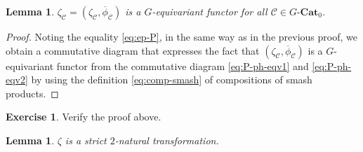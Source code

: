 \documentclass{surv-l}
\numberwithin{equation}{chapter}
\numberwithin{figure}{chapter}
\theoremstyle{plain}
\newtheorem{lem}[thm]{Lemma}
\theoremstyle{definition}
\newtheorem{exc}[thm]{Exercise}
\theoremstyle{remark}
\newcommand{\GCat}{G\text{-}\mathbf{Cat}}
\begin{document}
\begin{lem}$\zeta_{{\mathcal{C}}}=(\zeta_{{\mathcal{C}}},\overline{\phi}_{{\mathcal{C}}})$
is a $G$-equivariant functor for all ${\mathcal{C}} \in \GCat_0$.
\end{lem}

\begin{proof}
Noting the equality \eqref{eq:ep-P},
in the same way as in the previous proof,
we obtain a commutative diagram that expresses the fact that
$(\zeta_{{\mathcal{C}}},\overline{\phi}_{{\mathcal{C}}})$
is a $G$-equivariant functor
from the commutative diagram \eqref{eq:P-ph-eqv1} and \eqref{eq:P-ph-eqv2}
by using the definition \eqref{eq:comp-smash} of compositions of smash products.
\end{proof}

\begin{exc}
Verify the proof above.
\end{exc}

\begin{lem}\label{lem:ep-strict-2-nat-tr}
$\zeta$ is a strict $2$-natural transformation.
\end{lem}
\end{document}
